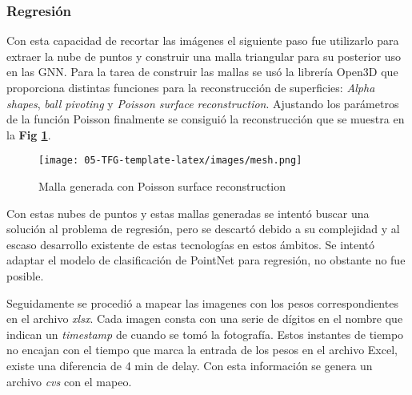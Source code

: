 \documentclass[12pt,a4paper]{article}
\begin{document}
\subsubsection{Regresión}
Con esta capacidad de recortar las imágenes el siguiente paso fue utilizarlo para extraer la nube de puntos y construir una malla triangular para su posterior uso en las GNN.
Para la tarea de construir las mallas se usó la librería Open3D\cite{open3D} que proporciona distintas funciones para la reconstrucción de superficies: \textit{Alpha shapes}, \textit{ball pivoting} y \textit{Poisson surface reconstruction}. Ajustando los parámetros de la función Poisson finalmente se consiguió la reconstrucción que se muestra en la \textbf{Fig \ref{mesh}}.

\begin{figure}
\centering
\texttt{[image: 05-TFG-template-latex/images/mesh.png]}
\caption{Malla generada con Poisson surface reconstruction}
\label{mesh}
\end{figure}

Con estas nubes de puntos y estas mallas generadas se intentó buscar una solución al problema de regresión, pero se descartó debido a su complejidad y al escaso desarrollo existente de estas tecnologías en estos ámbitos. Se intentó adaptar el modelo de clasificación de PointNet\cite{pointnet} para regresión, no obstante no fue posible.

Seguidamente se procedió a mapear las imagenes con los pesos correspondientes en el archivo \textit{xlsx}. Cada imagen consta con una serie de dígitos en el nombre que indican un \textit{timestamp} de cuando se tomó la fotografía. Estos instantes de tiempo no encajan con el tiempo que marca la entrada de los pesos en el archivo Excel, existe una diferencia de 4 min de delay. Con esta información se genera un archivo \textit{cvs} con el mapeo.
\end{document}
